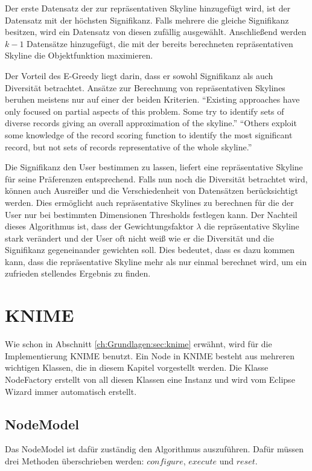 Der erste Datensatz der zur repräsentativen Skyline hinzugefügt wird, ist der Datensatz mit der höchsten Signifikanz. Falls mehrere die gleiche Signifikanz besitzen, wird ein Datensatz von diesen zufällig ausgewählt.
Anschließend werden $k-1$ Datensätze hinzugefügt, die mit der bereits berechneten repräsentativen Skyline die Objektfunktion maximieren.

Der Vorteil des E-Greedy liegt darin, dass er sowohl Signifikanz als auch Diversität betrachtet. Ansätze zur Berechnung von repräsentativen Skylines beruhen meistens nur auf einer der beiden Kriterien.  
\enquote{Existing approaches have only focused on partial aspects of this problem. Some try to identify sets of diverse records giving an overall approximation of the skyline.}
\enquote{Others exploit some knowledge of the record scoring function to identify the most significant record, but not sets of records representative of the whole skyline.} \cite[p. 1]{magnani2014taking}
 
Die Signifikanz den User bestimmen zu lassen, liefert eine repräsentative Skyline für seine Präferenzen entsprechend. Falls nun noch die Diversität betrachtet wird, können auch Ausreißer und die Verschiedenheit von Datensätzen berücksichtigt werden. Dies ermöglicht auch repräsentative Skylines zu berechnen für die der User nur bei bestimmten Dimensionen Thresholds festlegen kann.
Der Nachteil dieses Algorithmus ist, dass der Gewichtungsfaktor $\lambda$ die repräsentative Skyline stark verändert und der User oft nicht weiß wie er die Diversität und die Signifikanz gegeneinander gewichten soll. Dies bedeutet, dass es dazu kommen kann, dass die repräsentative Skyline mehr als nur einmal berechnet wird, um ein zufrieden stellendes Ergebnis zu finden.
\section{KNIME}
\label{ch:Analyse:sec:knime}
Wie schon in Abschnitt \ref{ch:Grundlagen:sec:knime} erwähnt, wird für die Implementierung KNIME benutzt. Ein Node in KNIME besteht aus mehreren wichtigen Klassen, die in diesem Kapitel vorgestellt werden. Die Klasse NodeFactory erstellt von all diesen Klassen eine Instanz und wird vom Eclipse Wizard immer automatisch erstellt.
\subsection{NodeModel}
\label{ch:Analyse:sec:knime:subsec:nodeModel}
Das NodeModel ist dafür zuständig den Algorithmus auszuführen. Dafür müssen drei Methoden überschrieben werden: $configure$, $execute$ und $reset$.

